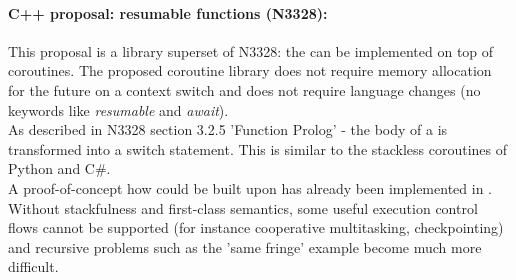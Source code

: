 \paragraph*{C++ proposal: resumable functions (N3328\cite{n3328}):}
This proposal is a library superset of N3328: the \resumfn can be implemented
on top of coroutines. The proposed coroutine library does not require memory allocation
for the future on a context switch and does not require language changes (no keywords
like \textit{resumable} and \textit{await}).\\
As described in N3328 section 3.2.5 'Function Prolog' - the body of a \resumfn is
transformed into a switch statement. This is similar to the stackless coroutines
of Python and C\#.\\
A proof-of-concept how \await could be built upon \boostcoroutine has already been
implemented in \awaitemu.\\
\newline
Without stackfulness and first-class semantics, some useful execution control
flows cannot be supported (for instance cooperative multitasking,
checkpointing) and recursive problems such as the 'same fringe' example become
much more difficult.

